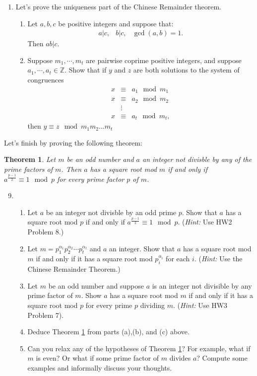 \documentclass[11pt]{article}
\newtheorem{theorem}{Theorem}
\newcommand{\bZ}{\mathbb{Z}}
\begin{document}
\begin{enumerate}
{\begin{enumerate}
{    }
  \end{enumerate}
  }
  \item{
  Let's prove the uniqueness part of the Chinese Remainder theorem.
  \begin{enumerate}
    \item{
    Let $a,b,c$ be positive integers and suppose that:
    \begin{eqnarray*}
      a|c,&b|c,&\gcd(a,b) = 1.
    \end{eqnarray*}
    Then $ab|c$.
    }
    \item{
    Suppose $m_1,\cdots,m_t$ are pairwise coprime positive integers, and suppose $a_1,\cdots,a_t\in\bZ$.  Show that if $y$ and $z$ are both solutions to the system of congruences
    \begin{eqnarray*}
      x&\equiv& a_1\mod m_1\\
      x&\equiv& a_2\mod m_2\\
      &\vdots&\\
      x&\equiv& a_t\mod m_t,
    \end{eqnarray*}
     then $y\equiv z\mod m_1m_2\dots m_t$
     }
   \end{enumerate}
  }
\end{enumerate}
  Let's finish by proving the following theorem:
\begin{theorem}\label{SquareRoots}
  Let $m$ be an odd number and $a$ an integer not divisble by any of the prime factors of $m$.  Then $a$ has a square root mod $m$ if and only if $a^{\frac{p-1}{2}}\equiv 1\mod p$ for every prime factor $p$ of $m$.
\end{theorem}
\begin{enumerate}
  \setcounter{enumi}{8}
  \item{
  \begin{enumerate}
    \item{
    Let $a$ be an integer not divisble by an odd prime $p$.  Show that $a$ has a square root mod $p$ if and only if $a^{\frac{p-1}{2}}\equiv 1\mod p$. (\textit{Hint:} Use HW2 Problem 8.)
    }
    \item{
    Let $m = p_1^{\alpha_1}p_2^{\alpha_2}\cdots p_t^{\alpha_t}$ and $a$ an integer.  Show that $a$ has a square root mod $m$ if and only if it has a square root mod $p_i^{\alpha_i}$ for each $i$. (\textit{Hint:} Use the Chinese Remainder Theorem.)
    }
    \item{
    Let $m$ be an odd number and suppose $a$ is an integer not divisible by any prime factor of $m$.  Show $a$ has a square root mod $m$ if and only if it has a square root mod $p$ for every prime $p$ dividing $m$. (\textit{Hint:} Use HW3 Problem 7).
    }
    \item{
    Deduce Theorem \ref{SquareRoots} from parts (a),(b), and (c) above.
    }
    \item{
    Can you relax any of the hypotheses of Theorem \ref{SquareRoots}?  For example, what if $m$ is even?  Or what if some prime factor of $m$ divides $a$?  Compute some examples and informally discuss your thoughts.
    }
  \end{enumerate}
  }
\end{enumerate}
\end{document}
